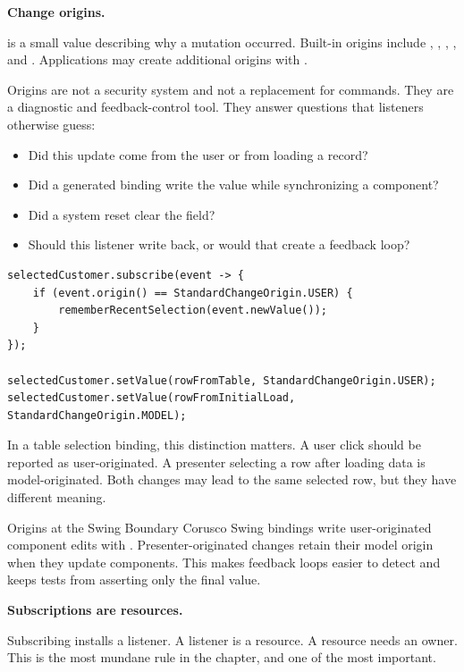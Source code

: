 \textbf{Change origins.}

 is a small value describing why a mutation
occurred. Built-in origins include , , ,
, and . Applications may create additional origins
with .

Origins are not a security system and not a replacement for commands. They are a
diagnostic and feedback-control tool. They answer questions that listeners
otherwise guess:

\begin{itemize}
\item Did this update come from the user or from loading a record?
\item Did a generated binding write the value while synchronizing a component?
\item Did a system reset clear the field?
\item Should this listener write back, or would that create a feedback loop?
\end{itemize}

\begin{lstlisting}[caption={Distinguishing user and model changes.}]
selectedCustomer.subscribe(event -> {
    if (event.origin() == StandardChangeOrigin.USER) {
        rememberRecentSelection(event.newValue());
    }
});

selectedCustomer.setValue(rowFromTable, StandardChangeOrigin.USER);
selectedCustomer.setValue(rowFromInitialLoad, StandardChangeOrigin.MODEL);
\end{lstlisting}

In a table selection binding, this distinction matters. A user click should be
reported as user-originated. A presenter selecting a row after loading data is
model-originated. Both changes may lead to the same selected row, but they have
different meaning.

\begin{coruscobox}{Origins at the Swing Boundary}
Corusco Swing bindings write user-originated component edits with
. Presenter-originated changes retain their model origin
when they update components. This makes feedback loops easier to detect and
keeps tests from asserting only the final value.
\end{coruscobox}

\textbf{Subscriptions are resources.}

Subscribing installs a listener. A listener is a resource. A resource needs an
owner. This is the most mundane rule in the chapter, and one of the most
important.


